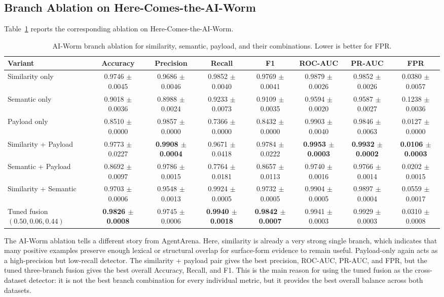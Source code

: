 \subsection{Branch Ablation on Here-Comes-the-AI-Worm}

Table~\ref{tab:tuned-aiworm-ablation} reports the corresponding
ablation on Here-Comes-the-AI-Worm.

\begin{table}[t]
\centering
\small
\setlength{\tabcolsep}{4pt}
\caption{AI-Worm branch ablation for similarity, semantic, payload,
and their combinations. Lower is better for FPR.}
\label{tab:tuned-aiworm-ablation}
\begin{tabular}{lccccccc}
\toprule
Variant & Accuracy & Precision & Recall & F1 & ROC-AUC & PR-AUC & FPR \\
\midrule
Similarity only
& 0.9746 $\pm$ 0.0045
& 0.9686 $\pm$ 0.0046
& 0.9852 $\pm$ 0.0040
& 0.9769 $\pm$ 0.0041
& 0.9879 $\pm$ 0.0026
& 0.9852 $\pm$ 0.0026
& 0.0380 $\pm$ 0.0057 \\
Semantic only
& 0.9018 $\pm$ 0.0036
& 0.8988 $\pm$ 0.0024
& 0.9233 $\pm$ 0.0073
& 0.9109 $\pm$ 0.0035
& 0.9594 $\pm$ 0.0020
& 0.9587 $\pm$ 0.0027
& 0.1238 $\pm$ 0.0036 \\
Payload only
& 0.8510 $\pm$ 0.0000
& 0.9857 $\pm$ 0.0000
& 0.7366 $\pm$ 0.0000
& 0.8432 $\pm$ 0.0000
& 0.9903 $\pm$ 0.0040
& 0.9846 $\pm$ 0.0063
& 0.0127 $\pm$ 0.0000 \\
Similarity + Payload
& 0.9773 $\pm$ 0.0227
& \textbf{0.9908 $\pm$ 0.0004}
& 0.9671 $\pm$ 0.0418
& 0.9784 $\pm$ 0.0222
& \textbf{0.9953 $\pm$ 0.0003}
& \textbf{0.9932 $\pm$ 0.0002}
& \textbf{0.0106 $\pm$ 0.0003} \\
Semantic + Payload
& 0.8692 $\pm$ 0.0097
& 0.9786 $\pm$ 0.0015
& 0.7764 $\pm$ 0.0181
& 0.8657 $\pm$ 0.0113
& 0.9740 $\pm$ 0.0016
& 0.9766 $\pm$ 0.0014
& 0.0202 $\pm$ 0.0015 \\
Similarity + Semantic
& 0.9703 $\pm$ 0.0006
& 0.9548 $\pm$ 0.0013
& 0.9924 $\pm$ 0.0005
& 0.9732 $\pm$ 0.0005
& 0.9904 $\pm$ 0.0005
& 0.9897 $\pm$ 0.0004
& 0.0559 $\pm$ 0.0017 \\
Tuned fusion $(0.50, 0.06, 0.44)$
& \textbf{0.9826 $\pm$ 0.0008}
& 0.9745 $\pm$ 0.0006
& \textbf{0.9940 $\pm$ 0.0018}
& \textbf{0.9842 $\pm$ 0.0007}
& 0.9941 $\pm$ 0.0003
& 0.9929 $\pm$ 0.0003
& 0.0310 $\pm$ 0.0008 \\
\bottomrule
\end{tabular}
\end{table}

The AI-Worm ablation tells a different story from AgentArena. Here,
similarity is already a very strong single branch, which indicates
that many positive examples preserve enough lexical or structural
overlap for surface-form evidence to remain useful. Payload-only
again acts as a high-precision but low-recall detector. The
similarity + payload pair gives the best precision, ROC-AUC,
PR-AUC, and FPR, but the tuned three-branch fusion gives the best
overall Accuracy, Recall, and F1. This is the main reason for using
the tuned fusion as the cross-dataset detector: it is not the best
branch combination for every individual metric, but it provides the
best overall balance across both datasets.

